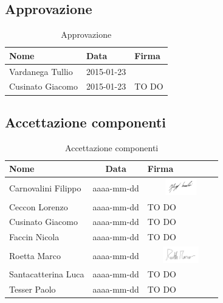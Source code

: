 	\subsection{Approvazione} %
	\label{sub:approvazione}
		\begin{table}[!h]
			\begin{center}
				\begin{tabularx}{0.8\textwidth}{|X|X|X|}
					\hline
					\textbf{Nome} & \textbf{Data} & \textbf{Firma} \\
					\hline
					\rule[-4mm]{0mm}{1cm}
					Vardanega Tullio &
					2015-01-23 &
					\\
					\hline
					\rule[-4mm]{0mm}{1cm}
					Cusinato Giacomo &
					2015-01-23 &
					TO DO \\
					\hline
				\end{tabularx}
			\end{center}
		\caption{Approvazione}
		\end{table}
	
	\subsection{Accettazione componenti} %
	\label{sub:accettazione_componenti}
		\begin{table}[!h]
			\begin{center}
				\begin{tabularx}{0.8\textwidth}{|p{5cm}|c|X|}
					\hline
					\textbf{Nome} & \textbf{Data} & \textbf{Firma} \\
					\hline
					\rule[-4mm]{0mm}{1cm}
					Carnovalini Filippo &
					aaaa-mm-dd &
					\includegraphics[height=0.7cm,width=2.9cm]{./images/firme/filippo.png} \\
					\hline
					\rule[-4mm]{0mm}{1cm}
					Ceccon Lorenzo &
					aaaa-mm-dd &
					TO DO \\
					\hline
					\rule[-4mm]{0mm}{1cm}
					Cusinato Giacomo &
					aaaa-mm-dd &
					TO DO \\
					\hline
					\rule[-4mm]{0mm}{1cm}
					Faccin Nicola &
					aaaa-mm-dd &
					TO DO \\
					\hline
					\rule[-4mm]{0mm}{1cm}
					Roetta Marco &
					aaaa-mm-dd &
					\includegraphics[height=0.7cm,width=2.9cm]{./images/firme/marco.png} \\
					\hline
					\rule[-4mm]{0mm}{1cm}
					Santacatterina Luca &
					aaaa-mm-dd &
					TO DO \\
					\hline
					\rule[-4mm]{0mm}{1cm}
					Tesser Paolo &
					aaaa-mm-dd &
					TO DO \\
					\hline
				\end{tabularx}
			\end{center}
		\caption{Accettazione componenti}
		\end{table}
	
